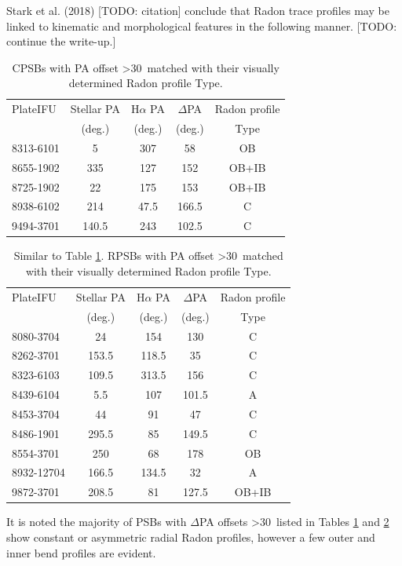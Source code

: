 Stark et al. (2018) [TODO: citation] conclude that Radon trace profiles may be linked to kinematic and morphological features in the following manner. [TODO: continue the write-up.]


\begin{table}
\centering
\caption{CPSBs with PA offset \textgreater 30\textdegree\ matched with their visually determined Radon profile Type.}
\label{tab:offsetCPSBs-Radon-Type}
\begin{tabular}{lcccc}
\hline
PlateIFU  & Stellar PA & H$\alpha$ PA & $\Delta$PA & Radon profile\\
  & (deg.) & (deg.) & (deg.) & Type \\
\hline
8313-6101 & 5 & 307 & 58 & OB \\
8655-1902 & 335 & 127 & 152 & OB+IB \\
8725-1902 & 22 & 175 & 153 & OB+IB \\
8938-6102 & 214 & 47.5 & 166.5 & C \\
9494-3701 & 140.5 & 243 & 102.5 & C \\
\hline
\end{tabular}
\end{table}

\begin{table}
\centering
\caption{Similar to Table \ref{tab:offsetCPSBs-Radon-Type}. RPSBs with PA offset \textgreater 30\textdegree\ matched with their visually determined Radon profile Type.}
\label{tab:offsetRPSBs-Radon-Type}
\begin{tabular}{lcccc}
\hline
PlateIFU   & Stellar PA & H$\alpha$ PA & $\Delta$PA & Radon profile \\
  & (deg.) & (deg.) & (deg.) & Type\\
\hline
8080-3704 & 24 & 154 & 130 & C \\
8262-3701 & 153.5 & 118.5 & 35 & C \\
8323-6103 & 109.5 & 313.5 & 156 & C \\
8439-6104 & 5.5 & 107 & 101.5 & A \\
8453-3704 & 44 & 91 & 47 & C \\
8486-1901 & 295.5 & 85 & 149.5 & C \\
8554-3701 & 250 & 68 & 178 & OB \\
8932-12704 & 166.5 & 134.5 & 32 & A \\
9872-3701 & 208.5 & 81 & 127.5 & OB+IB \\
\hline
\end{tabular}
\end{table}

It is noted the majority of PSBs with $\Delta$PA offsets \textgreater 30\textdegree\ listed in Tables \ref{tab:offsetCPSBs-Radon-Type} and \ref{tab:offsetRPSBs-Radon-Type} show constant or asymmetric radial Radon profiles, however a few outer and inner bend profiles are evident. 